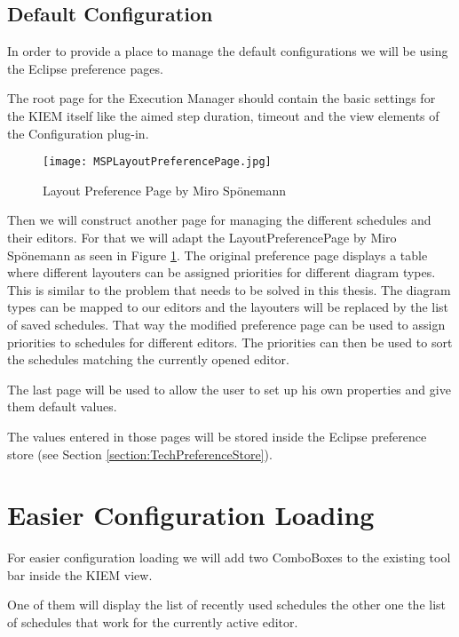 \subsection{Default Configuration}
\label{section:ConfConceptsDefaultConf}
In order to provide a place to manage the default configurations we will be
using the Eclipse preference pages.

The root page for the Execution Manager should contain the basic settings for the \ac{KIEM} itself like
the aimed step duration, timeout and the view elements of the Configuration plug-in.

\begin{figure}[MSPLayoutPreferencePage]
  \centering
  \texttt{[image: MSPLayoutPreferencePage.jpg]}
  \caption[Layout Preference Page by Miro Sp\"onemann]%
  {Layout Preference Page by Miro Sp\"onemann\protect}
  \label{fig:MSPLayoutPreferencePage}
\end{figure}

Then we will construct another page for managing the different schedules
and their editors. For that we will adapt the LayoutPreferencePage by Miro Sp\"onemann
as seen in Figure \ref{fig:MSPLayoutPreferencePage}. The original preference page
displays a table where different layouters can be assigned priorities for different diagram
types. This is similar to the problem that needs to be solved in this thesis. The diagram types
can be mapped to our editors and the layouters will be replaced by the list of saved schedules.
That way the modified preference page can be used to assign priorities to schedules for
different editors. The priorities can then be used to sort the schedules matching
the currently opened editor.

The last page will be used to allow the user to set up his own properties and give them
default values.

The values entered in those pages will be stored inside the Eclipse preference
store (see Section \ref{section:TechPreferenceStore}).

\section{Easier Configuration Loading}
\label{section:ConfConceptsEasyLoading}
For easier configuration loading we will add two ComboBoxes to the existing
tool bar inside the \ac{KIEM} view.

One of them will display the list of recently used schedules the other one the
list of schedules that work for the currently active editor.

